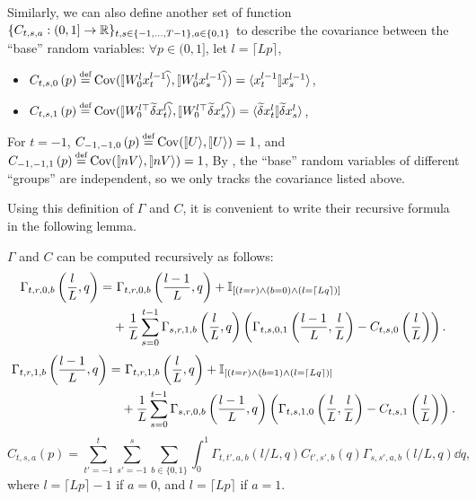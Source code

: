 \documentclass{article}
\theoremstyle{plain}
\theoremstyle{definition}
\begin{document}
Similarly, we can also define another set of function $\{C_{t,s,a}:(0, 1]\to \mathbb{R}\}_{t,s\in \{-1, \ldots, T-1\}, a\in \{0,1\}}$ to describe the covariance between the ``base'' random variables:  $\forall p\in (0,1]$, let $l=\lceil Lp\rceil$,
\begin{itemize}
    \item $C_{t,s,0}\left(p\right) \odefeq \Cov(\hatket{W_0^lx_t^{l-1}}, \hatket{W_0^lx_s^{l-1}})=\braket{x_t^{l-1}}{x_s^{l-1}}$,
    \item $C_{t,s,1}\left(p\right) \odefeq \Cov(\hatket{W_0^{l\top}\tilde\del x_t^l}, \hatket{W_0^{l\top}\tilde\del x_s^l})=\braket{\tilde\del x_t^l}{\tilde\del x_s^l}$,
\end{itemize}
For $t=-1$, $C_{-1,-1,0}\left(p\right) \odefeq \Cov(\ket{U}, \ket{U})=1$, and $C_{-1,-1,1}\left(p\right) \odefeq \Cov(\ket{nV}, \ket{nV})=1$,
By , the ``base'' random variables of different ``groups'' are independent, so we only tracks the covariance listed above.

Using this definition of $\Gamma$ and $C$, it is convenient to write their  recursive formula in the following lemma. 

\begin{lemma}\label{lemma:finite_depth_gamma}
$\Gamma$ and $C$ can be computed recursively as follows:
    \begin{align*} 
     \Gamma_{t,r,0,b}\left(\frac l L, q\right) = &~\Gamma_{t,r,0,b}\left(\frac{l-1}L, q\right) + \mathbb{I}_{[(t=r) \wedge (b=0) \wedge (l=\lceil L q\rceil)]} \\
     & + \frac1L \sum_{s=0}^{t-1} \Gamma_{s,r,1,b}\left(\frac l L, q\right)\left(\Gamma_{t,s,0,1}\left(\frac{l-1}L, \frac l L\right)-C_{t,s,0}\left(\frac l L\right)\right).
    \end{align*}
    \begin{align*} 
     \Gamma_{t,r,1,b}\left(\frac {l-1} L, q\right) = &~\Gamma_{t,r,1,b}\left(\frac{l}L, q\right) + \mathbb{I}_{[(t=r) \wedge (b=1) \wedge (l=\lceil L q\rceil)]} \\
     & + \frac1L \sum_{s=0}^{t-1} \Gamma_{s,r,0,b}\left(\frac {l-1} L, q\right)\left(\Gamma_{t,s,1,0}\left(\frac{l}L, \frac l L\right)-C_{t,s,1}\left(\frac l L\right)\right).
     \end{align*}
     \[C_{t,s,a}(p)=\sum_{t'=-1}^{t}\sum_{s'=-1}^{s}\sum_{b\in\{0,1\}}\int_0^1 \Gamma_{t,t',a,b}(l/L,q) C_{t',s',b}(q)\Gamma_{s,s',a,b}(l/L,q) \dd q,\] where $l=\lceil Lp\rceil -1$ if $a=0$, and  $l=\lceil Lp\rceil$ if $a=1$.
\end{lemma}
\end{document}
